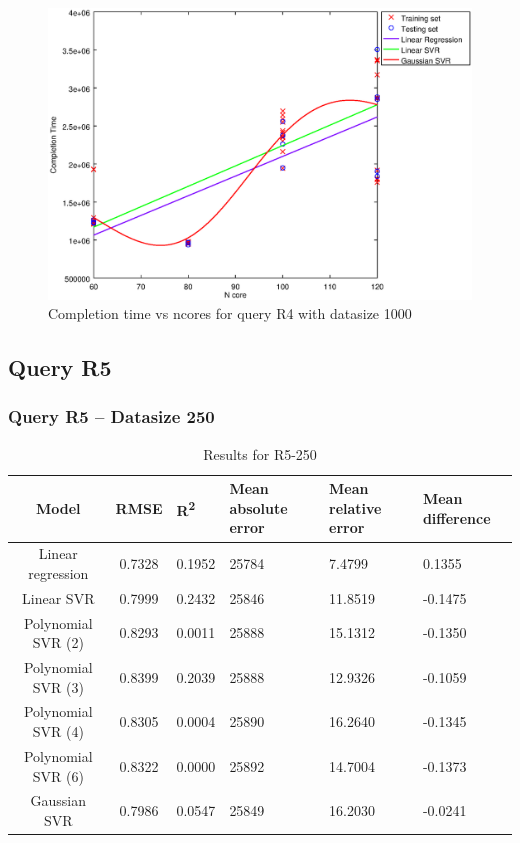 \documentclass[a4paper,11pt]{article}
\begin{document}
\begin {figure}[hbtp]
\centering
\includegraphics[width=\textwidth]{output/R4_1000_ONLY_1_LINEAR_NCORE/plot_R4_1000_bestmodels.eps}
\caption{Completion time vs ncores for query R4 with datasize 1000}
\label{fig:coreonly_linear_R4_1000}
\end {figure}

\newpage
\subsection{Query R5}
\subsubsection{Query R5 -- Datasize 250}
\begin{table}[H]
	\centering
	\begin{adjustbox}{center}
		\begin{tabular}{c | c M{1.2cm} M{2.5cm} M{2.5cm} M{1.8cm}}
			Model & RMSE & R\textsuperscript{2} & Mean absolute error & Mean relative error & Mean difference \tabularnewline
			\hline
			Linear regression & 0.7328 & 0.1952 &  25784 & 7.4799 & 0.1355 \\
			Linear SVR & 0.7999 & 0.2432 &  25846 & 11.8519 & -0.1475 \\
			Polynomial SVR (2) & 0.8293 & 0.0011 &  25888 & 15.1312 & -0.1350 \\
			Polynomial SVR (3) & 0.8399 & 0.2039 &  25888 & 12.9326 & -0.1059 \\
			Polynomial SVR (4) & 0.8305 & 0.0004 &  25890 & 16.2640 & -0.1345 \\
			Polynomial SVR (6) & 0.8322 & 0.0000 &  25892 & 14.7004 & -0.1373 \\
			Gaussian SVR & 0.7986 & 0.0547 &  25849 & 16.2030 & -0.0241 \\
		\end{tabular}
	\end{adjustbox}
	\\
	\caption{Results for R5-250}
	\label{fig:coreonly_linear_R5_250}
\end{table}
\end{document}
